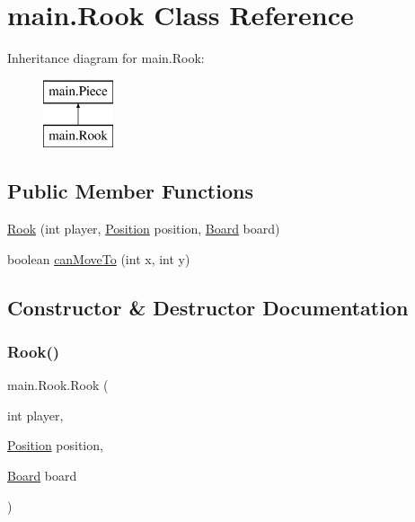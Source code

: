 \hypertarget{classmain_1_1_rook}{}\section{main.\+Rook Class Reference}
\label{classmain_1_1_rook}
Inheritance diagram for main.\+Rook\+:\begin{figure}[H]
\begin{center}
\leavevmode
\includegraphics[height=2.000000cm]{classmain_1_1_rook}
\end{center}
\end{figure}
\subsection*{Public Member Functions}
\begin{DoxyCompactItemize}
\item 
\hyperlink{classmain_1_1_rook_a529075916777b2174122f592d3366d90}{Rook} (int player, \hyperlink{classmain_1_1_position}{Position} position, \hyperlink{classmain_1_1_board}{Board} board)
\item 
boolean \hyperlink{classmain_1_1_rook_a91848ddd38f797d23ab1be23d357fef7}{can\+Move\+To} (int x, int y)
\end{DoxyCompactItemize}


\subsection{Constructor \& Destructor Documentation}
\mbox{\label{classmain_1_1_rook_a529075916777b2174122f592d3366d90}} 
\subsubsection{\texorpdfstring{Rook()}{Rook()}}
{\footnotesize\ttfamily main.\+Rook.\+Rook (\begin{DoxyParamCaption}\item[{int}]{player,  }\item[{\hyperlink{classmain_1_1_position}{Position}}]{position,  }\item[{\hyperlink{classmain_1_1_board}{Board}}]{board }\end{DoxyParamCaption})}

